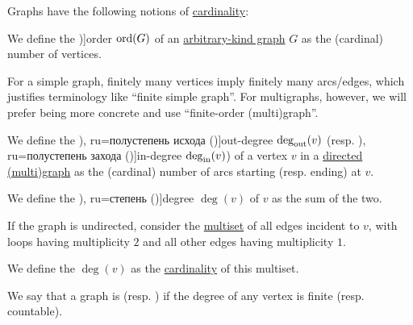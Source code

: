 \begin{definition}\label{def:graph_cardinality}
  Graphs have the following notions of \hyperref[thm:cardinality_existence]{cardinality}:
  \begin{thmenum}
     We define the \term[ru=порядок (\cite[9]{Емеличев1990})]{order} \( \operatorname{ord}(G) \) of an \hyperref[rem:arbitrary_kind_graph]{arbitrary-kind graph} \( G \) as the (cardinal) number of vertices.

    For a simple graph, finitely many vertices imply finitely many arcs/edges, which justifies terminology like \enquote{finite simple graph}. For multigraphs, however, we will prefer being more concrete and use \enquote{finite-order (multi)graph}.

     We define the \term[bg=полустепен на изхода (\incite[8]{Мирчев2001}), ru=полустепень исхода (\cite[283]{Емеличев1990})]{out-degree} \( \deg_{\op{out}}(v) \) (resp. \term[bg=полустепен на входа (\incite[8]{Мирчев2001}), ru=полустепень захода (\cite[283]{Емеличев1990})]{in-degree} \( \deg_{\op{in}}(v) \)) of a vertex \( v \) in a \hyperref[def:directed_multigraph]{directed (multi)graph} as the (cardinal) number of arcs starting (resp. ending) at \( v \).

    We define the \term[bg=степен (\cite[8]{Мирчев2001}), ru=степень (\cite[283]{Емеличев1990})]{degree} \( \deg(v) \) of \( v \) as the sum of the two.

    \mimprovised If the graph is undirected, consider the \hyperref[def:multiset]{multiset} of all edges incident to \( v \), with loops having multiplicity \( 2 \) and all other edges having multiplicity \( 1 \).

    We define the  \( \deg(v) \) as the \hyperref[def:multiset/cardinality]{cardinality} of this multiset.

     We say that a graph is  (resp. ) if the degree of any vertex is finite (resp. countable).
  \end{thmenum}
\end{definition}

